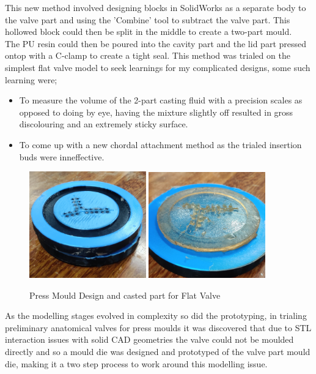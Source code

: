 This new method involved designing blocks in SolidWorks as a separate body to the valve part and using the 'Combine' tool to subtract the valve part. This hollowed block could then be split in the middle to create a two-part mould.\\
The \gls{PU} resin could then be poured into the cavity part and the lid part pressed ontop with a C-clamp to create a tight seal.
\mynewline
This method was trialed on the simplest flat valve model to seek learnings for my complicated designs, some such learning were;
\begin{itemize}
    \item To measure the volume of the 2-part casting fluid with a precision scales as opposed to doing by eye, having the mixture slightly off resulted in gross discolouring and an extremely sticky surface.
    \item To come up with a new chordal attachment method as the trialed insertion buds were inneffective.
\end{itemize}
\begin{figure}
    \centering
    \includegraphics[width=0.45\textwidth]{figures/flat mould}
    \includegraphics[width=0.45\textwidth]{figures/flat valve}
    \caption{Press Mould Design and casted part for Flat Valve}
    \label{fig:flat mould}
\end{figure}

\mynewline
As the modelling stages evolved in complexity so did the prototyping, in trialing preliminary anatomical valves for press moulds it was discovered that due to STL interaction issues with solid \gls{CAD} geometries the valve could not be moulded directly and so a mould die was designed and prototyped of the valve part mould die, making it a two step process to work around this modelling issue.

